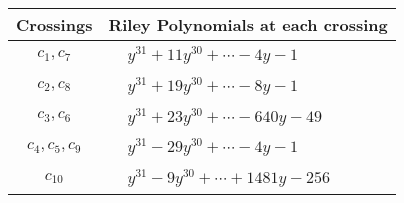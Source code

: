 \documentclass[1p]{elsarticle_modified}
\theoremstyle{definition}
\begin{document}
\begin{tabular}{m{50pt}|m{274pt}}
Crossings & \hspace{64pt}Riley Polynomials at each crossing \\
\hline $$\begin{aligned}c_{1},c_{7}\end{aligned}$$&$\begin{aligned}
&y^{31}+11 y^{30}+\cdots-4 y-1
\end{aligned}$\\
\hline $$\begin{aligned}c_{2},c_{8}\end{aligned}$$&$\begin{aligned}
&y^{31}+19 y^{30}+\cdots-8 y-1
\end{aligned}$\\
\hline $$\begin{aligned}c_{3},c_{6}\end{aligned}$$&$\begin{aligned}
&y^{31}+23 y^{30}+\cdots-640 y-49
\end{aligned}$\\
\hline $$\begin{aligned}c_{4},c_{5},c_{9}\end{aligned}$$&$\begin{aligned}
&y^{31}-29 y^{30}+\cdots-4 y-1
\end{aligned}$\\
\hline $$\begin{aligned}c_{10}\end{aligned}$$&$\begin{aligned}
&y^{31}-9 y^{30}+\cdots+1481 y-256
\end{aligned}$\\
\hline
\end{tabular}
\vskip 2pc
\end{document}
